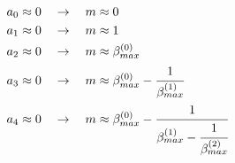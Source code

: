 \begin{align}
	a_0 \approx 0 \quad &\rightarrow \quad m \approx 0\\
	a_1 \approx 0 \quad &\rightarrow \quad m \approx 1\\
	a_2 \approx 0 \quad &\rightarrow \quad m \approx \beta^{(0)}_{max}\\
	a_3 \approx 0 \quad &\rightarrow \quad m \approx \beta^{(0)}_{max} - \cfrac{1}{\beta^{(1)}_{max}}\\
	a_4 \approx 0 \quad &\rightarrow \quad m \approx \beta^{(0)}_{max} - \cfrac{1}{\beta^{(1)}_{max} - \cfrac{1}{\beta^{(2)}_{max}}}
\end{align}